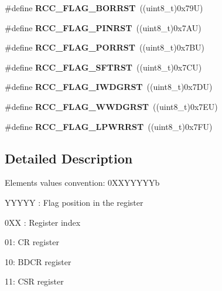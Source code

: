 \begin{DoxyCompactItemize}
\#define {\bfseries R\+C\+C\+\_\+\+F\+L\+A\+G\+\_\+\+B\+O\+R\+R\+ST}~((uint8\+\_\+t)0x79\+U)
\item 
\mbox{\label{group___r_c_c___flag_gabfc3ab5d4a8a94ec1c9f38794ce37ad6}} 
\#define {\bfseries R\+C\+C\+\_\+\+F\+L\+A\+G\+\_\+\+P\+I\+N\+R\+ST}~((uint8\+\_\+t)0x7\+A\+U)
\item 
\mbox{\label{group___r_c_c___flag_ga39ad309070f416720207eece5da7dc2c}} 
\#define {\bfseries R\+C\+C\+\_\+\+F\+L\+A\+G\+\_\+\+P\+O\+R\+R\+ST}~((uint8\+\_\+t)0x7\+B\+U)
\item 
\mbox{\label{group___r_c_c___flag_gaf7852615e9b19f0b2dbc8d08c7594b52}} 
\#define {\bfseries R\+C\+C\+\_\+\+F\+L\+A\+G\+\_\+\+S\+F\+T\+R\+ST}~((uint8\+\_\+t)0x7\+C\+U)
\item 
\mbox{\label{group___r_c_c___flag_gaac46bac8a97cf16635ff7ffc1e6c657f}} 
\#define {\bfseries R\+C\+C\+\_\+\+F\+L\+A\+G\+\_\+\+I\+W\+D\+G\+R\+ST}~((uint8\+\_\+t)0x7\+D\+U)
\item 
\mbox{\label{group___r_c_c___flag_gaa80b60b2d497ccd7b7de1075009999a7}} 
\#define {\bfseries R\+C\+C\+\_\+\+F\+L\+A\+G\+\_\+\+W\+W\+D\+G\+R\+ST}~((uint8\+\_\+t)0x7\+E\+U)
\item 
\mbox{\label{group___r_c_c___flag_ga67049531354aed7546971163d02c9920}} 
\#define {\bfseries R\+C\+C\+\_\+\+F\+L\+A\+G\+\_\+\+L\+P\+W\+R\+R\+ST}~((uint8\+\_\+t)0x7\+F\+U)
\end{DoxyCompactItemize}


\subsection{Detailed Description}
Elements values convention\+: 0X\+X\+Y\+Y\+Y\+Y\+Yb
\begin{DoxyItemize}
\item Y\+Y\+Y\+YY \+: Flag position in the register
\item 0XX \+: Register index
\begin{DoxyItemize}
\item 01\+: CR register
\item 10\+: B\+D\+CR register
\item 11\+: C\+SR register 
\end{DoxyItemize}
\end{DoxyItemize}